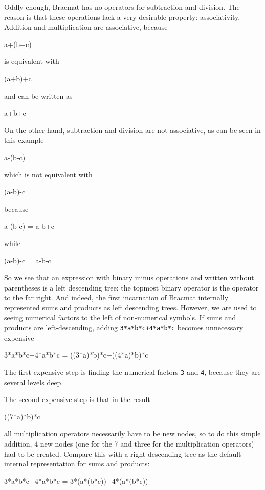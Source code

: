 \documentclass[12pt]{article}
\begin{document}
Oddly enough, Bracmat has no operators for subtraction and
division. The reason is that these operations lack a very desirable
property: associativity. Addition and multiplication are associative,
because
\begin{v}
a+(b+c)
\end{v}
is equivalent with
\begin{v}
(a+b)+c
\end{v}
and can be written as
\begin{v}
a+b+c
\end{v}
On the other hand, subtraction and division are not associative, as
can be seen in this example
\begin{v}
a-(b-c)
\end{v}
which is not equivalent with
\begin{v}
(a-b)-c
\end{v}
because
\begin{v}
a-(b-c) = a-b+c
\end{v}
while
\begin{v}
(a-b)-c = a-b-c
\end{v}

So we see that an expression with binary minus operations and written
without parentheses is a left descending tree: the topmost binary
operator is the operator to the far right. And indeed, the first
incarnation of Bracmat internally represented sums and products as
left descending trees. However, we are used to seeing numerical factors
to the left of non-numerical symbols. If sums and products are
left-descending, adding \verb|3*a*b*c+4*a*b*c| becomes unnecessary
expensive
\begin{v}
3*a*b*c+4*a*b*c = ((3*a)*b)*c+((4*a)*b)*c
\end{v}

The first expensive step is finding the numerical factors \verb|3| and
\verb|4|, because they are several levels deep.

The second expensive step is that in the result
\begin{v}
((7*a)*b)*c
\end{v}
all multiplication operators necessarily have to be new nodes, so to
do this simple addition, 4 new nodes (one for the 7 and three for the
multiplication operators) had to be created. Compare this with a right
descending tree as the default internal representation for sums and
products:
\begin{v}
3*a*b*c+4*a*b*c = 3*(a*(b*c))+4*(a*(b*c))
\end{v}
\end{document}
